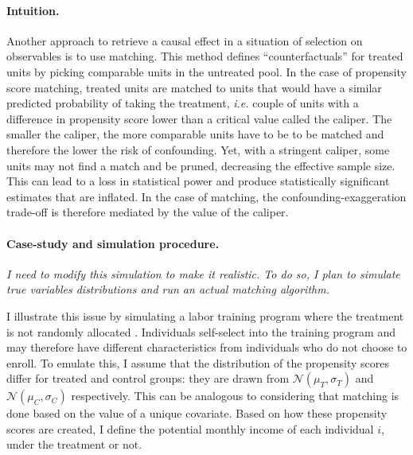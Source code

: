 \documentclass[usletter, 12pt]{article}
\begin{document}
			\paragraph{Intuition.} Another approach to retrieve a causal effect in a situation of selection on observables is to use matching. This method defines ``counterfactuals'' for treated units by picking comparable units in the untreated pool. 
			In the case of propensity score matching, treated units are matched to units that would have a similar predicted probability of taking the treatment, \textit{i.e.} couple of units with a difference in propensity score lower than a critical value called the caliper. The smaller the caliper, the more comparable units have to be to be matched and therefore the lower the risk of confounding. Yet, with a stringent caliper, some units may not find a match and be pruned, decreasing the effective sample size. This can lead to a loss in statistical power and produce statistically significant estimates that are inflated. In the case of matching, the confounding-exaggeration trade-off is therefore mediated by the value of the caliper.
                
       	 	\paragraph{Case-study and simulation procedure.} \textit{I need to modify this simulation to make it realistic. To do so, I plan to simulate true variables distributions and run an actual matching algorithm.}
		
		 I illustrate this issue by simulating a labor training program where the treatment is not randomly allocated \citep{dehejia_causal_1999}. Individuals self-select into the training program and may therefore have different characteristics from individuals who do not choose to enroll. To emulate this, I assume that the distribution of the propensity scores differ for treated and control groups: they are drawn from $\mathcal{N}(\mu_T,\sigma_T)$ and $\mathcal{N}(\mu_C, \sigma_C)$ respectively. This can be analogous to considering that matching is done based on the value of a unique covariate. Based on how these propensity scores are created, I define the potential monthly income of each individual $i$, under the treatment or not.%
        
\end{document}
